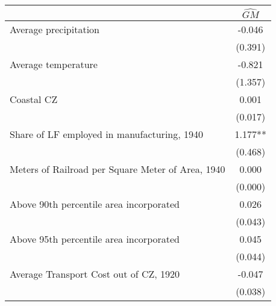  \begin{tabular}{l*{1}{c}} \toprule
                &\multicolumn{1}{c}{$\widehat{GM}$}\\
\midrule
Average precipitation&   -0.046   \\
                &  (0.391)   \\
\addlinespace
Average temperature&   -0.821   \\
                &  (1.357)   \\
\addlinespace
Coastal CZ      &    0.001   \\
                &  (0.017)   \\
\addlinespace
Share of LF employed in manufacturing, 1940&    1.177** \\
                &  (0.468)   \\
\addlinespace
Meters of Railroad per Square Meter of Area, 1940&    0.000   \\
                &  (0.000)   \\
\addlinespace
Above 90th percentile area incorporated&    0.026   \\
                &  (0.043)   \\
\addlinespace
Above 95th percentile area incorporated&    0.045   \\
                &  (0.044)   \\
\addlinespace
Average Transport Cost out of CZ, 1920&   -0.047   \\
                &  (0.038)   \\
 \bottomrule \end{tabular}

